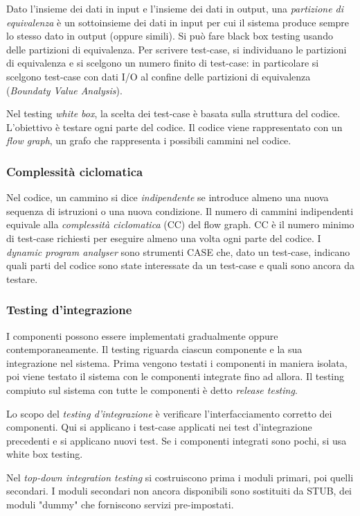 \documentclass[11pt]{article}
\begin{document}
Dato l'insieme dei dati in input e l'insieme dei dati in 
output, una \textit{partizione di equivalenza} è un sottoinsieme dei dati in input per cui il sistema produce sempre lo 
stesso dato in output (oppure simili). Si può fare black box testing usando delle partizioni di equivalenza.
Per scrivere test-case, si individuano le partizioni di equivalenza e si scelgono un numero finito di test-case: in 
particolare si scelgono test-case con dati I/O al confine delle partizioni di equivalenza (\textit{Boundaty Value Analysis}).

Nel testing \textit{white box}, la scelta dei test-case è basata sulla struttura del codice. L'obiettivo è testare ogni 
parte del codice. Il codice viene rappresentato con un \textit{flow graph}, un grafo che rappresenta i possibili cammini 
nel codice.
\subsubsection{Complessità ciclomatica}
Nel codice, un cammino si dice \textit{indipendente} se introduce almeno una nuova sequenza di istruzioni o una nuova 
condizione. Il numero di cammini indipendenti equivale alla \textit{complessità ciclomatica} (CC) del flow graph. CC è 
il numero minimo di test-case richiesti per eseguire almeno una volta ogni parte del codice. I \textit{dynamic program
analyser} sono strumenti CASE che, dato un test-case, indicano quali parti del codice sono state interessate da un 
test-case e quali sono ancora da testare.
\subsubsection*{Testing d'integrazione}
I componenti possono essere implementati gradualmente oppure contemporaneamente. Il testing riguarda ciascun componente 
e la sua integrazione nel sistema. Prima vengono testati i componenti in maniera isolata, poi viene testato il sistema 
con le componenti integrate fino ad allora. Il testing compiuto sul sistema con tutte le componenti è detto \textit{release 
testing}.

Lo scopo del \textit{testing d'integrazione} è verificare l'interfacciamento corretto dei componenti. Qui si applicano i 
test-case applicati nei test d'integrazione precedenti e si applicano nuovi test. Se i componenti integrati sono pochi, 
si usa white box testing.

Nel \textit{top-down integration testing} si costruiscono prima i moduli primari, poi quelli secondari. I moduli secondari 
non ancora disponibili sono sostituiti da STUB, dei moduli "dummy" che forniscono servizi pre-impostati.
\end{document}
